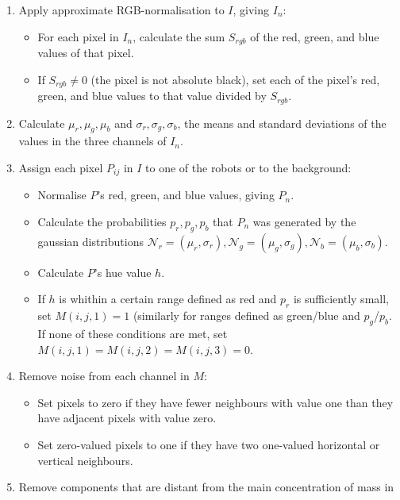 \documentclass[10pt,a4paper]{article}
\begin{document}
\begin{enumerate}
    \item
    Apply approximate RGB-normalisation to $I$, giving $I_n$:
    \begin{itemize}
        \item
        For each pixel in $I_n$, calculate the sum $S_{rgb}$ of the red, green, 
        and blue values of that pixel.
        \item
        If $S_{rgb} \ne 0$ (the pixel is not absolute black), set each of the 
        pixel's red, green, and blue values to that value divided by $S_{rgb}$.
    \end{itemize}
    \item
    Calculate $\mu_r, \mu_g, \mu_b$ and $\sigma_r, \sigma_g, \sigma_b$, the 
    means and standard deviations of the values in the three channels of $I_n$.
    \item
    Assign each pixel $P_{ij}$ in $I$ to one of the robots or to the background:
    \begin{itemize}
        \item
        Normalise $P$'s red, green, and blue values, giving $P_n$.
        \item
        Calculate the probabilities $p_r, p_g, p_b$ that $P_n$ was generated 
        by the gaussian distributions $\mathcal{N}_r = (\mu_r, \sigma_r),
        \mathcal{N}_g = (\mu_g, \sigma_g), \mathcal{N}_b = (\mu_b, \sigma_b)$.
        \item
        Calculate $P$'s hue value $h$.
        \item
        If $h$ is whithin a certain range defined as red and $p_r$ is
        sufficiently small, set $M(i,j,1) = 1$ (similarly for ranges defined as
        green/blue and $p_g$/$p_b$. If none of these conditions are met, set
        $M(i,j,1) = M(i,j,2) = M(i,j,3) = 0$.
    \end{itemize}
    \item
    Remove noise from each channel in $M$:
    \begin{itemize}
        \item
        Set pixels to zero if they have fewer neighbours with value one than
        they have adjacent pixels with value zero.
        \item
        Set zero-valued pixels to one if they have two one-valued 
        horizontal or vertical neighbours.
    \end{itemize}
    \item
    Remove components that are distant from the main concentration of mass in

\end{enumerate}
\end{document}
